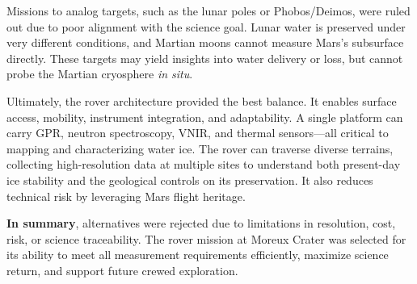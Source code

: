 Missions to analog targets, such as the lunar poles or Phobos/Deimos, were ruled out due to poor alignment with the science goal. Lunar water is preserved under very different conditions, and Martian moons cannot measure Mars’s subsurface directly. These targets may yield insights into water delivery or loss, but cannot probe the Martian cryosphere \textit{in situ}.

Ultimately, the rover architecture provided the best balance. It enables surface access, mobility, instrument integration, and adaptability. A single platform can carry GPR, neutron spectroscopy, VNIR, and thermal sensors—all critical to mapping and characterizing water ice. The rover can traverse diverse terrains, collecting high-resolution data at multiple sites to understand both present-day ice stability and the geological controls on its preservation. It also reduces technical risk by leveraging Mars flight heritage.

\textbf{In summary}, alternatives were rejected due to limitations in resolution, cost, risk, or science traceability. The rover mission at Moreux Crater was selected for its ability to meet all measurement requirements efficiently, maximize science return, and support future crewed exploration.